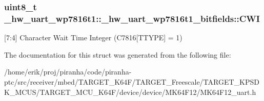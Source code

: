 \subsubsection[{\texorpdfstring{C\+WI}{CWI}}]{\setlength{\rightskip}{0pt plus 5cm}uint8\+\_\+t \+\_\+hw\+\_\+uart\+\_\+wp7816t1\+::\+\_\+hw\+\_\+uart\+\_\+wp7816t1\+\_\+bitfields\+::\+C\+WI}\hypertarget{struct__hw__uart__wp7816t1_1_1__hw__uart__wp7816t1__bitfields_a89bf640feb8f976eb2ff56b277e8bd06}{}\label{struct__hw__uart__wp7816t1_1_1__hw__uart__wp7816t1__bitfields_a89bf640feb8f976eb2ff56b277e8bd06}
\mbox{[}7\+:4\mbox{]} Character Wait Time Integer (C7816\mbox{[}T\+T\+Y\+PE\mbox{]} = 1) 

The documentation for this struct was generated from the following file\+:\begin{DoxyCompactItemize}
\item 
/home/erik/proj/piranha/code/piranha-\/ptc/src/receiver/mbed/\+T\+A\+R\+G\+E\+T\+\_\+\+K64\+F/\+T\+A\+R\+G\+E\+T\+\_\+\+Freescale/\+T\+A\+R\+G\+E\+T\+\_\+\+K\+P\+S\+D\+K\+\_\+\+M\+C\+U\+S/\+T\+A\+R\+G\+E\+T\+\_\+\+M\+C\+U\+\_\+\+K64\+F/device/device/\+M\+K64\+F12/M\+K64\+F12\+\_\+uart.\+h\end{DoxyCompactItemize}
